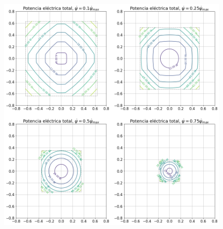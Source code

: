 \documentclass[12pt]{article}
\begin{document}
\begin{figure}[h]
	\centering
	\includegraphics[width=.9\linewidth]{power_map_base_2_psi_dot}
	\label{fig:power_ct_speed_psi_dot}
\end{figure}
\end{document}
